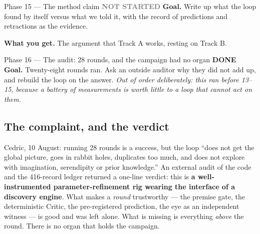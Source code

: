 \documentclass[11pt,a4paper]{article}
\newcommand{\done}{\textcolor{good}{\textbf{DONE}}}
\newcommand{\todo}{\textcolor{grey}{\textbf{NOT STARTED}}}
\begin{document}
\begin{phasebox}{Phase 15 --- The method claim \hfill \todo}
\textbf{Goal.} Write up what the loop found by itself versus what we told it, with the record of
predictions and retractions as the evidence.

\textbf{What you get.} The argument that Track A works, resting on Track B.
\end{phasebox}

\begin{phasebox}{Phase 16 --- The audit: 28 rounds, and the campaign had no organ \hfill \done}
\textbf{Goal.} Twenty-eight rounds ran. Ask an outside auditor why they did not add up, and rebuild
the loop on the answer. \emph{Out of order deliberately: this ran before 13--15, because a battery
of measurements is worth little to a loop that cannot act on them.}

\subsection*{The complaint, and the verdict}
Cedric, 10 August: running 28 rounds is a success, but the loop ``does not get the global picture,
goes in rabbit holes, duplicates too much, and does not explore with imagination, serendipity or
prior knowledge.'' An external audit of the code and the 416-record ledger returned a one-line
verdict: this is \textbf{a well-instrumented parameter-refinement rig wearing the interface of a
discovery engine}. What makes a \emph{round} trustworthy --- the premise gate, the deterministic
Critic, the pre-registered prediction, the eye as an independent witness --- is good and was left
alone. What is missing is everything \emph{above} the round. There is no organ that holds the
campaign.


\end{phasebox}
\end{document}
